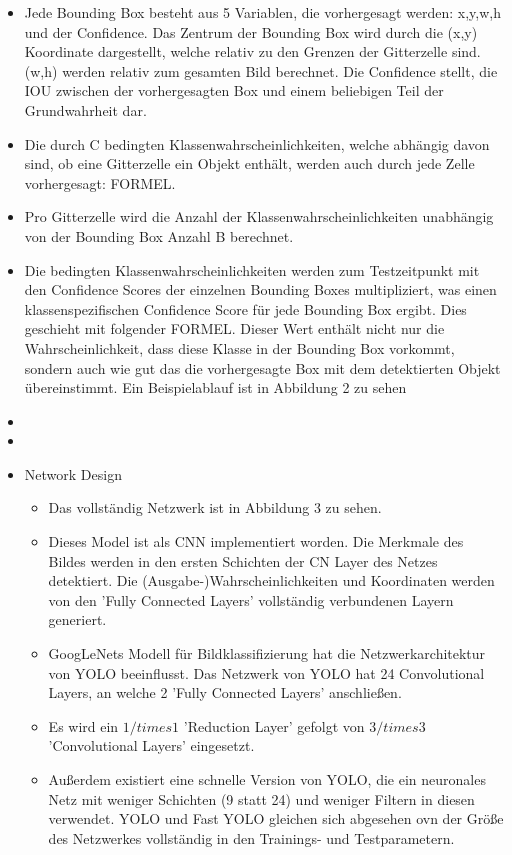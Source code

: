 {\begin{itemize}
\begin{itemize}
			\item Jede Bounding Box besteht aus 5 Variablen, die vorhergesagt werden: x,y,w,h und der Confidence. Das Zentrum der Bounding Box wird durch die (x,y) Koordinate dargestellt, welche relativ zu den Grenzen der Gitterzelle sind. (w,h) werden relativ zum gesamten Bild berechnet. Die Confidence stellt, die IOU zwischen der vorhergesagten Box und einem beliebigen Teil der Grundwahrheit dar.
			\item Die durch C bedingten Klassenwahrscheinlichkeiten, welche abhängig davon sind, ob eine Gitterzelle ein Objekt enthält, werden auch durch jede Zelle vorhergesagt: FORMEL. 
			\item Pro Gitterzelle wird die Anzahl der Klassenwahrscheinlichkeiten unabhängig von der Bounding Box Anzahl B berechnet.
			\item Die bedingten Klassenwahrscheinlichkeiten werden zum Testzeitpunkt mit den Confidence Scores der einzelnen Bounding Boxes multipliziert, was einen klassenspezifischen Confidence Score für jede Bounding Box ergibt. Dies geschieht mit folgender FORMEL. Dieser Wert enthält nicht nur die Wahrscheinlichkeit, dass diese Klasse in der Bounding Box vorkommt, sondern auch wie gut das die vorhergesagte Box mit dem detektierten Objekt übereinstimmt. Ein Beispielablauf ist in Abbildung 2 zu sehen
			\item 
			\item 
			\item Network Design
			\begin{itemize}
				\item Das vollständig Netzwerk ist in Abbildung 3 zu sehen. 
				\item Dieses Model ist als CNN implementiert worden. Die Merkmale des Bildes werden in den ersten Schichten der CN Layer des Netzes detektiert. Die (Ausgabe-)Wahrscheinlichkeiten und Koordinaten werden von den 'Fully Connected Layers' vollständig verbundenen Layern generiert.
				\item GoogLeNets Modell für Bildklassifizierung hat die Netzwerkarchitektur von YOLO beeinflusst. Das Netzwerk von YOLO hat 24 Convolutional Layers, an welche 2 'Fully Connected Layers' anschließen.
				\item Es wird ein $1 /times 1$ 'Reduction Layer' gefolgt von  $3 /times 3$ 'Convolutional Layers' eingesetzt.
				\item Außerdem existiert eine schnelle Version von YOLO, die ein neuronales Netz mit weniger Schichten (9 statt 24) und weniger Filtern in diesen verwendet. YOLO und Fast YOLO gleichen sich abgesehen ovn der Größe des Netzwerkes vollständig in den Trainings- und Testparametern.

\end{itemize}
\end{itemize}
\end{itemize}}
